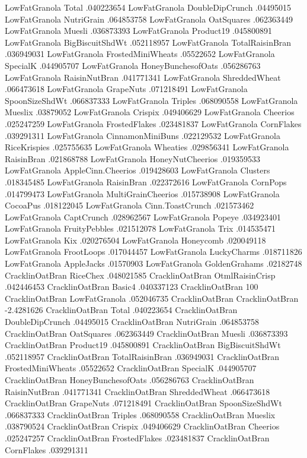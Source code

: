 LowFatGranola	Total	.040223654
LowFatGranola	DoubleDipCrunch	.04495015
LowFatGranola	NutriGrain	.064853758
LowFatGranola	OatSquares	.062363449
LowFatGranola	Muesli	.036873393
LowFatGranola	Product19	.045800891
LowFatGranola	BigBiscuitShdWt	.052118957
LowFatGranola	TotalRaisinBran	.036949031
LowFatGranola	FrostedMiniWheats	.05522652
LowFatGranola	SpecialK	.044905707
LowFatGranola	HoneyBunchesofOats	.056286763
LowFatGranola	RaisinNutBran	.041771341
LowFatGranola	ShreddedWheat	.066473618
LowFatGranola	GrapeNuts	.071218491
LowFatGranola	SpoonSizeShdWt	.066837333
LowFatGranola	Triples	.068090558
LowFatGranola	Mueslix	.03879052
LowFatGranola	Crispix	.049406629
LowFatGranola	Cheerios	.025247259
LowFatGranola	FrostedFlakes	.023481837
LowFatGranola	CornFlakes	.039291311
LowFatGranola	CinnamonMiniBuns	.022129532
LowFatGranola	RiceKrispies	.025755635
LowFatGranola	Wheaties	.029856341
LowFatGranola	RaisinBran	.021868788
LowFatGranola	HoneyNutCheerios	.019359533
LowFatGranola	AppleCinn.Cheerios	.019428603
LowFatGranola	Clusters	.018345485
LowFatGranola	RaisinBran	.022372616
LowFatGranola	CornPops	.014799473
LowFatGranola	MultiGrainCheerios	.015738908
LowFatGranola	CocoaPus	.018122045
LowFatGranola	Cinn.ToastCrunch	.021573462
LowFatGranola	CaptCrunch	.028962567
LowFatGranola	Popeye	.034923401
LowFatGranola	FruityPebbles	.021512078
LowFatGranola	Trix	.014535471
LowFatGranola	Kix	.020276504
LowFatGranola	Honeycomb	.020049118
LowFatGranola	FrootLoops	.017044457
LowFatGranola	LuckyCharms	.018711826
LowFatGranola	AppleJacks	.01570903
LowFatGranola	GoldenGrahams	.02182748
CracklinOatBran	RiceChex	.048021585
CracklinOatBran	OtmlRaisinCrisp	.042446453
CracklinOatBran	Basic4	.040337123
CracklinOatBran	100%
CracklinOatBran	LowFatGranola	.052046735
CracklinOatBran	CracklinOatBran	-2.4281626
CracklinOatBran	Total	.040223654
CracklinOatBran	DoubleDipCrunch	.04495015
CracklinOatBran	NutriGrain	.064853758
CracklinOatBran	OatSquares	.062363449
CracklinOatBran	Muesli	.036873393
CracklinOatBran	Product19	.045800891
CracklinOatBran	BigBiscuitShdWt	.052118957
CracklinOatBran	TotalRaisinBran	.036949031
CracklinOatBran	FrostedMiniWheats	.05522652
CracklinOatBran	SpecialK	.044905707
CracklinOatBran	HoneyBunchesofOats	.056286763
CracklinOatBran	RaisinNutBran	.041771341
CracklinOatBran	ShreddedWheat	.066473618
CracklinOatBran	GrapeNuts	.071218491
CracklinOatBran	SpoonSizeShdWt	.066837333
CracklinOatBran	Triples	.068090558
CracklinOatBran	Mueslix	.038790524
CracklinOatBran	Crispix	.049406629
CracklinOatBran	Cheerios	.025247257
CracklinOatBran	FrostedFlakes	.023481837
CracklinOatBran	CornFlakes	.039291311
